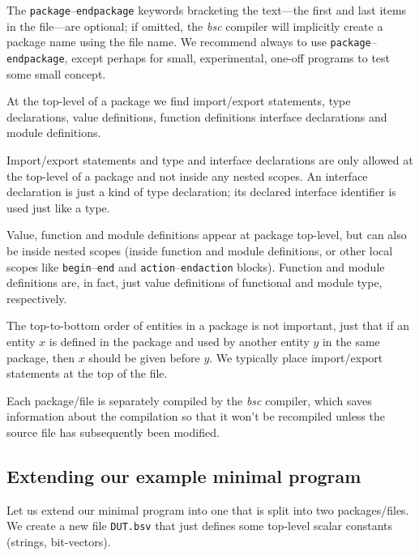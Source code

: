 The \verb|package|--\verb|endpackage| keywords bracketing the
text---the first and last items in the file---are optional; if
omitted, the \emph{bsc} compiler will implicitly create a package name
using the file name.  We recommend always to use
\verb|package|--\verb|endpackage|, except perhaps for small,
experimental, one-off programs to test some small concept.

At the top-level of a package we find import/export statements, type
declarations, value definitions, function definitions interface
declarations and module definitions.

Import/export statements and type and interface declarations are only
allowed at the top-level of a package and not inside any nested
scopes.  An interface declaration is just a kind of type declaration;
its declared interface identifier is used just like a type.

Value, function and module definitions appear at package top-level,
but can also be inside nested scopes (inside function and module
definitions, or other local scopes like \verb|begin|--\verb|end| and
\verb|action|--\verb|endaction| blocks).  Function and module
definitions are, in fact, just value definitions of functional and
module type, respectively.

The top-to-bottom order of entities in a package is not important,
just that if an entity $x$ is defined in the package and used by
another entity $y$ in the same package, then $x$ should be given
before $y$.  We typically place import/export statements at the top of
the file.

Each package/file is separately compiled by the \emph{bsc} compiler,
which saves information about the compilation so that it won't be
recompiled unless the source file has subsequently been modified.

\hdivider


\subsection{Extending our example minimal {\BSV} program}

\label{Sec_Top_and_DUT}

Let us extend our minimal {\BSV} program into one that is split into two
packages/files.  We create a new file \verb|DUT.bsv| that just defines
some top-level scalar constants (strings, bit-vectors).

